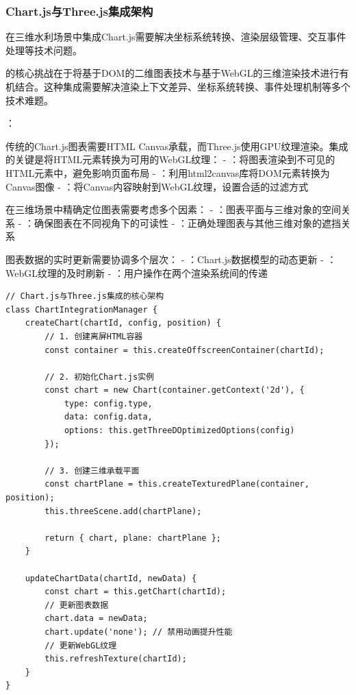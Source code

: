 \hypertarget{chart.jsux4e0ethree.jsux96c6ux6210ux67b6ux6784}{%
\subsubsection{Chart.js与Three.js集成架构}\label{chart.jsux4e0ethree.jsux96c6ux6210ux67b6ux6784}}

在三维水利场景中集成Chart.js需要解决坐标系统转换、渲染层级管理、交互事件处理等技术问题。

的核心挑战在于将基于DOM的二维图表技术与基于WebGL的三维渲染技术进行有机结合。这种集成需要解决渲染上下文差异、坐标系统转换、事件处理机制等多个技术难题。

：


传统的Chart.js图表需要HTML Canvas承载，而Three.js使用GPU纹理渲染。集成的关键是将HTML元素转换为可用的WebGL纹理： - ：将图表渲染到不可见的HTML元素中，避免影响页面布局 - ：利用html2canvas库将DOM元素转换为Canvas图像 - ：将Canvas内容映射到WebGL纹理，设置合适的过滤方式


在三维场景中精确定位图表需要考虑多个因素： - ：图表平面与三维对象的空间关系 - ：确保图表在不同视角下的可读性 - ：正确处理图表与其他三维对象的遮挡关系


图表数据的实时更新需要协调多个层次： - ：Chart.js数据模型的动态更新 - ：WebGL纹理的及时刷新 - ：用户操作在两个渲染系统间的传递

\begin{lstlisting}[style=javascript]
// Chart.js与Three.js集成的核心架构
class ChartIntegrationManager {
    createChart(chartId, config, position) {
        // 1. 创建离屏HTML容器
        const container = this.createOffscreenContainer(chartId);
        
        // 2. 初始化Chart.js实例
        const chart = new Chart(container.getContext('2d'), {
            type: config.type,
            data: config.data,
            options: this.getThreeDOptimizedOptions(config)
        });
        
        // 3. 创建三维承载平面
        const chartPlane = this.createTexturedPlane(container, position);
        this.threeScene.add(chartPlane);
        
        return { chart, plane: chartPlane };
    }
    
    updateChartData(chartId, newData) {
        const chart = this.getChart(chartId);
        // 更新图表数据
        chart.data = newData;
        chart.update('none'); // 禁用动画提升性能
        // 更新WebGL纹理
        this.refreshTexture(chartId);
    }
}
\end{lstlisting}

